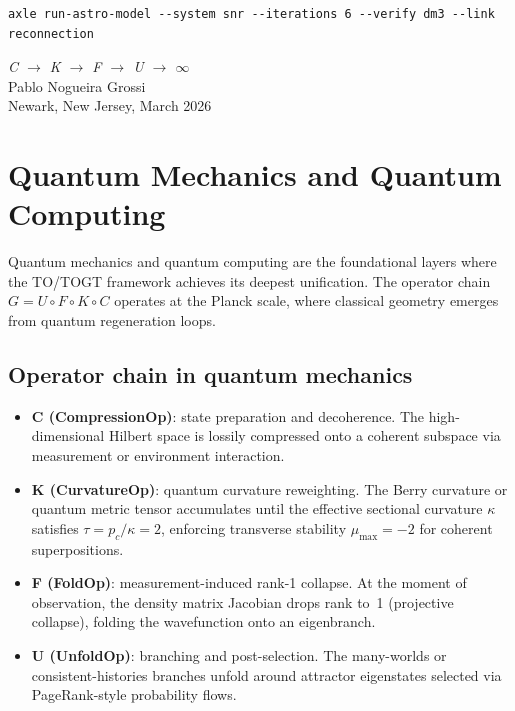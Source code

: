 \begin{verbatim}
axle run-astro-model --system snr --iterations 6 --verify dm3 --link reconnection
\end{verbatim}

\bigskip
\begin{flushright}
\textit{C \;$\to$\; K \;$\to$\; F \;$\to$\; U \;$\to$\; $\infty$}\\[0.3em]
Pablo Nogueira Grossi\\
Newark, New Jersey, March 2026
\end{flushright}

\chapter{Quantum Mechanics and Quantum Computing}

Quantum mechanics and quantum computing are the foundational layers where the TO/TOGT framework achieves its deepest unification. The operator chain $G = U \circ F \circ K \circ C$ operates at the Planck scale, where classical geometry emerges from quantum regeneration loops.

\section{Operator chain in quantum mechanics}

\begin{itemize}
\item \textbf{C (CompressionOp)}: state preparation and decoherence. The high-dimensional Hilbert space is lossily compressed onto a coherent subspace via measurement or environment interaction.
\item \textbf{K (CurvatureOp)}: quantum curvature reweighting. The Berry curvature or quantum metric tensor accumulates until the effective sectional curvature \(\kappa\) satisfies \(\tau = p_c / \kappa = 2\), enforcing transverse stability \(\mu_{\max} = -2\) for coherent superpositions.
\item \textbf{F (FoldOp)}: measurement-induced rank-1 collapse. At the moment of observation, the density matrix Jacobian drops rank to~1 (projective collapse), folding the wavefunction onto an eigenbranch.
\item \textbf{U (UnfoldOp)}: branching and post-selection. The many-worlds or consistent-histories branches unfold around attractor eigenstates selected via PageRank-style probability flows.
\end{itemize}

